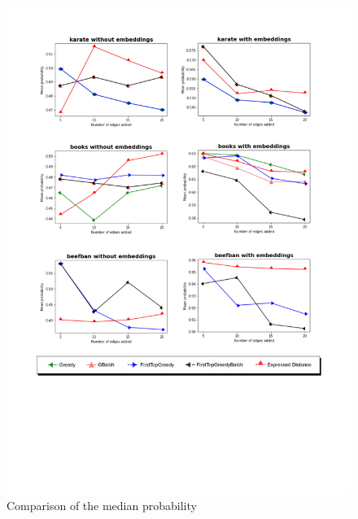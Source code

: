 \begin{figure}[!htbp]
	\begin{center}
	\advance\leftskip-1.3cm
	\captionsetup{justification=centering,margin=2cm}
	\includegraphics[width=1.1\textwidth]{Figures/m1}
	\caption{Comparison of the median probability}
	\end{center}
	\label{m1}
\end{figure}

\clearpage

